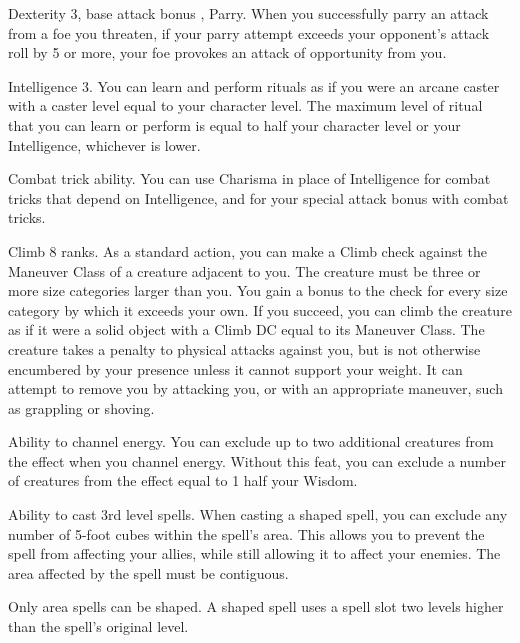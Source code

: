 \featpre Dexterity 3, base attack bonus , Parry.
\featben When you successfully parry an attack from a foe you threaten, if your parry attempt exceeds your opponent's attack roll by 5 or more, your foe provokes an attack of opportunity from you.

\featpre Intelligence 3.
\featben You can learn and perform rituals as if you were an arcane caster with a caster level equal to your character level. The maximum level of ritual that you can learn or perform is equal to half your character level or your Intelligence, whichever is lower.

\featpre Combat trick ability.
\featben You can use Charisma in place of Intelligence for combat tricks that depend on Intelligence, and for your special attack bonus with combat tricks.

\featpre Climb 8 ranks.
\featben As a standard action, you can make a Climb check against the Maneuver Class of a creature adjacent to you. The creature must be three or more size categories larger than you. You gain a  bonus to the check for every size category by which it exceeds your own. If you succeed, you can climb the creature as if it were a solid object with a Climb DC equal to its Maneuver Class. The creature takes a  penalty to physical attacks against you, but is not otherwise encumbered by your presence unless it cannot support your weight. It can attempt to remove you by attacking you, or with an appropriate maneuver, such as grappling or shoving.

 Ability to channel energy.
 You can exclude up to two additional creatures from the effect when you channel energy.
 Without this feat, you can exclude a number of creatures from the effect equal to 1 \add half your Wisdom.

 Ability to cast 3rd level spells.
 When casting a shaped spell, you can exclude any number of 5-foot cubes within the spell's area. This allows you to prevent the spell from affecting your allies, while still allowing it to affect your enemies. The area affected by the spell must be contiguous.

Only area spells can be shaped. A shaped spell uses a spell slot two levels higher than the spell's original level.

